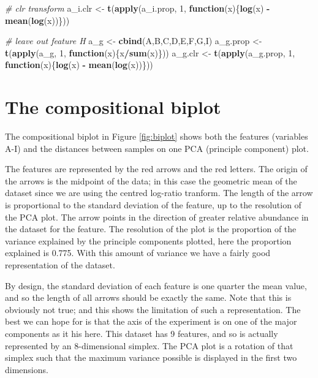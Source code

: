 \documentclass[onecolumn]{book}
\newenvironment{Shaded}{\begin{snugshade}}{\end{snugshade}}
\newcommand{\CommentTok}[1]{\textcolor[rgb]{0.56,0.35,0.01}{\textit{#1}}}
\newcommand{\ControlFlowTok}[1]{\textcolor[rgb]{0.13,0.29,0.53}{\textbf{#1}}}
\newcommand{\DecValTok}[1]{\textcolor[rgb]{0.00,0.00,0.81}{#1}}
\newcommand{\KeywordTok}[1]{\textcolor[rgb]{0.13,0.29,0.53}{\textbf{#1}}}
\newcommand{\NormalTok}[1]{#1}
\newcommand{\OperatorTok}[1]{\textcolor[rgb]{0.81,0.36,0.00}{\textbf{#1}}}
\newcommand{\StringTok}[1]{\textcolor[rgb]{0.31,0.60,0.02}{#1}}
\theoremstyle{definition}
\theoremstyle{definition}
\theoremstyle{definition}
\theoremstyle{remark}
\begin{document}
\begin{Shaded}
\begin{Highlighting}[]
\CommentTok{# clr transform}
\NormalTok{a_i.clr <-}\StringTok{ }\KeywordTok{t}\NormalTok{(}\KeywordTok{apply}\NormalTok{(a_i.prop, }\DecValTok{1}\NormalTok{, }\ControlFlowTok{function}\NormalTok{(x)\{}\KeywordTok{log}\NormalTok{(x) }\OperatorTok{-}\StringTok{ }\KeywordTok{mean}\NormalTok{(}\KeywordTok{log}\NormalTok{(x))\}))}

\CommentTok{# leave out feature H}
\NormalTok{a_g <-}\StringTok{ }\KeywordTok{cbind}\NormalTok{(A,B,C,D,E,F,G,I)}
\NormalTok{a_g.prop <-}\StringTok{ }\KeywordTok{t}\NormalTok{(}\KeywordTok{apply}\NormalTok{(a_g, }\DecValTok{1}\NormalTok{, }\ControlFlowTok{function}\NormalTok{(x)\{x}\OperatorTok{/}\KeywordTok{sum}\NormalTok{(x)\}))}
\NormalTok{a_g.clr <-}\StringTok{ }\KeywordTok{t}\NormalTok{(}\KeywordTok{apply}\NormalTok{(a_g.prop, }\DecValTok{1}\NormalTok{, }\ControlFlowTok{function}\NormalTok{(x)\{}\KeywordTok{log}\NormalTok{(x) }\OperatorTok{-}\StringTok{ }\KeywordTok{mean}\NormalTok{(}\KeywordTok{log}\NormalTok{(x))\}))}
\end{Highlighting}
\end{Shaded}

\hypertarget{the-compositional-biplot}{%
\section{The compositional biplot}\label{the-compositional-biplot}}

The compositional biplot in Figure \ref{fig:biplot} shows both the
features (variables A-I) and the distances between samples on one PCA
(principle component) plot.

The features are represented by the red arrows and the red letters. The
origin of the arrows is the midpoint of the data; in this case the
geometric mean of the dataset since we are using the centred log-ratio
tranform. The length of the arrow is proportional to the standard
deviation of the feature, up to the resolution of the PCA plot. The
arrow points in the direction of greater relative abundance in the
dataset for the feature. The resolution of the plot is the proportion of
the variance explained by the principle components plotted, here the
proportion explained is 0.775. With this amount of variance we have a
fairly good representation of the dataset.

By design, the standard deviation of each feature is one quarter the
mean value, and so the length of all arrows should be exactly the same.
Note that this is obviously not true; and this shows the limitation of
such a representation. The best we can hope for is that the axis of the
experiment is on one of the major components as it his here. This
dataset has 9 features, and so is actually represented by an
8-dimensional simplex. The PCA plot is a rotation of that simplex such
that the maximum variance possible is displayed in the first two
dimensions.
\end{document}
